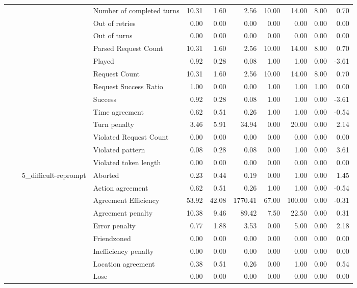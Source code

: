 \begin{tabular}{llllrrrrrrr}
 &  &  & Number of completed turns & 10.31 & 1.60 & 2.56 & 10.00 & 14.00 & 8.00 & 0.70 \\
 &  &  & Out of retries & 0.00 & 0.00 & 0.00 & 0.00 & 0.00 & 0.00 & 0.00 \\
 &  &  & Out of turns & 0.00 & 0.00 & 0.00 & 0.00 & 0.00 & 0.00 & 0.00 \\
 &  &  & Parsed Request Count & 10.31 & 1.60 & 2.56 & 10.00 & 14.00 & 8.00 & 0.70 \\
 &  &  & Played & 0.92 & 0.28 & 0.08 & 1.00 & 1.00 & 0.00 & -3.61 \\
 &  &  & Request Count & 10.31 & 1.60 & 2.56 & 10.00 & 14.00 & 8.00 & 0.70 \\
 &  &  & Request Success Ratio & 1.00 & 0.00 & 0.00 & 1.00 & 1.00 & 1.00 & 0.00 \\
 &  &  & Success & 0.92 & 0.28 & 0.08 & 1.00 & 1.00 & 0.00 & -3.61 \\
 &  &  & Time agreement & 0.62 & 0.51 & 0.26 & 1.00 & 1.00 & 0.00 & -0.54 \\
 &  &  & Turn penalty & 3.46 & 5.91 & 34.94 & 0.00 & 20.00 & 0.00 & 2.14 \\
 &  &  & Violated Request Count & 0.00 & 0.00 & 0.00 & 0.00 & 0.00 & 0.00 & 0.00 \\
 &  &  & Violated pattern & 0.08 & 0.28 & 0.08 & 0.00 & 1.00 & 0.00 & 3.61 \\
 &  &  & Violated token length & 0.00 & 0.00 & 0.00 & 0.00 & 0.00 & 0.00 & 0.00 \\
\cline{3-11}
 &  & \multirow[t]{27}{*}{5_difficult-reprompt} & Aborted & 0.23 & 0.44 & 0.19 & 0.00 & 1.00 & 0.00 & 1.45 \\
 &  &  & Action agreement & 0.62 & 0.51 & 0.26 & 1.00 & 1.00 & 0.00 & -0.54 \\
 &  &  & Agreement Efficiency & 53.92 & 42.08 & 1770.41 & 67.00 & 100.00 & 0.00 & -0.31 \\
 &  &  & Agreement penalty & 10.38 & 9.46 & 89.42 & 7.50 & 22.50 & 0.00 & 0.31 \\
 &  &  & Error penalty & 0.77 & 1.88 & 3.53 & 0.00 & 5.00 & 0.00 & 2.18 \\
 &  &  & Friendzoned & 0.00 & 0.00 & 0.00 & 0.00 & 0.00 & 0.00 & 0.00 \\
 &  &  & Inefficiency penalty & 0.00 & 0.00 & 0.00 & 0.00 & 0.00 & 0.00 & 0.00 \\
 &  &  & Location agreement & 0.38 & 0.51 & 0.26 & 0.00 & 1.00 & 0.00 & 0.54 \\
 &  &  & Lose & 0.00 & 0.00 & 0.00 & 0.00 & 0.00 & 0.00 & 0.00 \\

\end{tabular}
